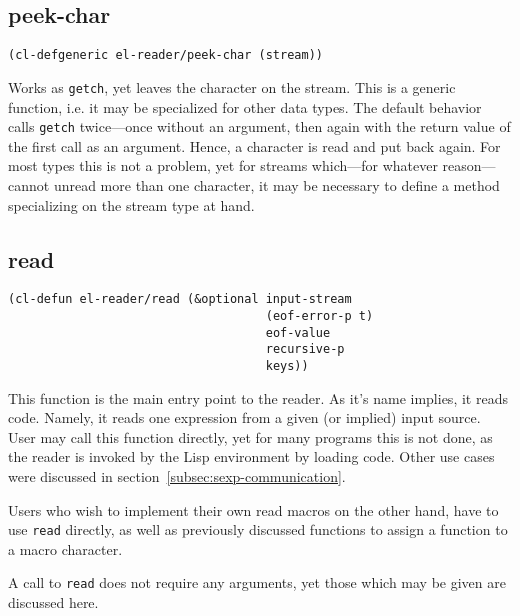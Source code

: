 \documentclass[a4paper,10pt,twoside]{report}
\newcommand{\fun}[1]{\texttt{#1}}
\newcommand{\Read}{\fun{read}}
\begin{document}
\subsection{peek-char}
\label{subsec:peek-char}

\begin{lstlisting}[style=lispinline]
(cl-defgeneric el-reader/peek-char (stream))
\end{lstlisting}

Works as \fun{getch}, yet leaves the character on the stream.  This is a generic
function, i.e. it may be specialized for other data types.  The default behavior
calls \fun{getch} twice---once without an argument, then again with the return
value of the first call as an argument.  Hence, a character is read and put back
again.  For most types this is not a problem, yet for streams which---for
whatever reason---cannot unread more than one character, it may be necessary to
define a method specializing on the stream type at hand.

\subsection{read}
\label{subsec:read}

\begin{lstlisting}[style=lispinline]
(cl-defun el-reader/read (&optional input-stream
                                    (eof-error-p t)
                                    eof-value
                                    recursive-p
                                    keys))
\end{lstlisting}

This function is the main entry point to the reader.  As it’s name implies, it
reads code.  Namely, it reads one expression from a given (or implied) input
source.  User may call this function directly, yet for many programs this is not
done, as the reader is invoked by the Lisp environment by loading code.  Other
use cases were discussed in section~\ref{subsec:sexp-communication}.

Users who wish to implement their own read macros on the other hand, have to use
\Read{} directly, as well as previously discussed functions to assign a function
to a macro character.

A call to \Read{} does not require any arguments, yet those which may be given
are discussed here.
\end{document}
